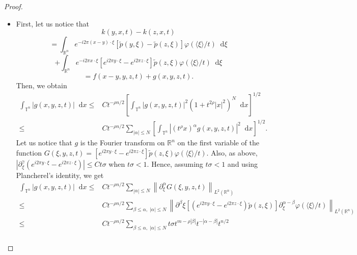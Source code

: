 \documentclass[12pt, reqno]{amsart}
\theoremstyle{definition}
\theoremstyle{remark}
\numberwithin{equation}{section}
\newcommand*\diff{\mathop{}\!\mathrm{d}}
\begin{document}
\begin{proof}
\begin{itemize}
        \item[(c)] First, let us notice that
        \begin{equation*}
            k(y, x, t) - k(z, x, t) 
        \end{equation*}
        \begin{equation*}
            =\int_{\mathbb{R}^n} e^{-i2\pi (x-y) \cdot \xi}[\tilde{p}(y, \xi) - \tilde{p}(z, \xi)]\varphi(\langle\xi\rangle/t) \diff \xi
        \end{equation*}
        \begin{equation*}
            +  
            \int_{\mathbb{R}^n} e^{-i2\pi x \cdot \xi} \left[ e^{i2\pi y \cdot \xi} -e^{i2\pi z \cdot \xi}  \right]\tilde{p}(z, \xi)\varphi(\langle\xi\rangle/t) \diff \xi
        \end{equation*}
        \begin{equation*}
            =f(x-y, y, z, t) + g(x, y, z, t).
        \end{equation*}
        Then, we obtain 
        \begin{align*}
            \int_{\mathbb{T}^n}|g(x, y, z, t)|\diff x \leq & Ct^{-\rho n/2} \left[ \int_{\mathbb{T}^n} |g(x, y, z, t)|^2(1 + t^{2\rho}|x|^2)^N \diff x  \right]^{1/2}\\
            \leq & Ct^{-\rho n/2} \sum_{|\alpha|\leq N}  \left[ \int_{\mathbb{T}^n} |(t^\rho x)^\alpha g(x, y, z, t)|^2\diff x  \right]^{1/2}.
        \end{align*}
        Let us notice that $g$ is the Fourier transform on $\mathbb{R}^n$ on the first variable of the function $G(\xi, y, z, t) = \left[ e^{i2\pi y \cdot \xi} -e^{i2\pi z \cdot \xi}  \right]\tilde{p}(z, \xi)\varphi(\langle\xi\rangle/t)$. Also, as above, $|\partial^\gamma_\xi( e^{i2\pi y \cdot \xi} -e^{i2\pi z \cdot \xi}  )| \leq Ct\sigma$ when $t\sigma<1$. Hence, assuming $t\sigma < 1$ and using Plancherel's identity, we get
        \begin{align*}
            \int_{\mathbb{T}^n}|g(x, y, z, t)|\diff x \leq &Ct^{-\rho n/2} \sum_{|\alpha|\leq N} \left\| \partial^\alpha_\xi G(\xi, y, z ,t) \right\|_{L^2(\mathbb{R}^n)}\\ 
            \leq &Ct^{-\rho n/2} \sum_{\beta\leq\alpha,\;|\alpha|\leq N} \left\| \partial^\beta\xi \left[ (e^{i2\pi y \cdot \xi} -e^{i2\pi z \cdot \xi})  \tilde{p}(z, \xi)\right]  \partial^{\alpha-\beta}_\xi\varphi(\langle\xi\rangle/t)  \right\|_{L^2(\mathbb{R}^n)} \\
            \leq & Ct^{-\rho n/2} \sum_{\beta\leq\alpha,\;|\alpha|\leq N} t\sigma t^{m-\rho|\beta|}t^{-|\alpha-\beta|}t^{n/2} \\

\end{align*}
\end{itemize}
\end{proof}
\end{document}
